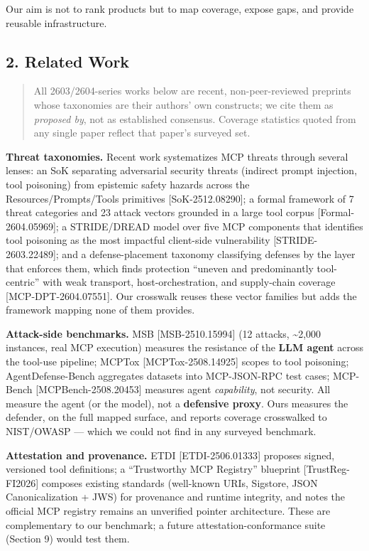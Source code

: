 \documentclass[
]{article}
\newcounter{none} %
\begin{document}
Our aim is not to rank products but to map coverage, expose gaps, and
provide reusable infrastructure.

\subsection{2. Related Work}\label{related-work}

\begin{quote}
All 2603/2604-series works below are recent, non-peer-reviewed preprints
whose taxonomies are their authors' own constructs; we cite them as
\emph{proposed by}, not as established consensus. Coverage statistics
quoted from any single paper reflect that paper's surveyed set.
\end{quote}

\textbf{Threat taxonomies.} Recent work systematizes MCP threats through
several lenses: an SoK separating adversarial security threats (indirect
prompt injection, tool poisoning) from epistemic safety hazards across
the Resources/Prompts/Tools primitives {[}SoK-2512.08290{]}; a formal
framework of 7 threat categories and 23 attack vectors grounded in a
large tool corpus {[}Formal-2604.05969{]}; a STRIDE/DREAD model over
five MCP components that identifies tool poisoning as the most impactful
client-side vulnerability {[}STRIDE-2603.22489{]}; and a
defense-placement taxonomy classifying defenses by the layer that
enforces them, which finds protection ``uneven and predominantly
tool-centric'' with weak transport, host-orchestration, and supply-chain
coverage {[}MCP-DPT-2604.07551{]}. Our crosswalk reuses these vector
families but adds the framework mapping none of them provides.

\textbf{Attack-side benchmarks.} MSB {[}MSB-2510.15994{]} (12 attacks,
\textasciitilde2,000 instances, real MCP execution) measures the
resistance of the \textbf{LLM agent} across the tool-use pipeline;
MCPTox {[}MCPTox-2508.14925{]} scopes to tool poisoning;
AgentDefense-Bench aggregates datasets into MCP-JSON-RPC test cases;
MCP-Bench {[}MCPBench-2508.20453{]} measures agent \emph{capability},
not security. All measure the agent (or the model), not a
\textbf{defensive proxy}. Ours measures the defender, on the full mapped
surface, and reports coverage crosswalked to NIST/OWASP --- which we
could not find in any surveyed benchmark.

\textbf{Attestation and provenance.} ETDI {[}ETDI-2506.01333{]} proposes
signed, versioned tool definitions; a ``Trustworthy MCP Registry''
blueprint {[}TrustReg-FI2026{]} composes existing standards (well-known
URIs, Sigstore, JSON Canonicalization + JWS) for provenance and runtime
integrity, and notes the official MCP registry remains an unverified
pointer architecture. These are complementary to our benchmark; a future
attestation-conformance suite (Section 9) would test them.
\end{document}
